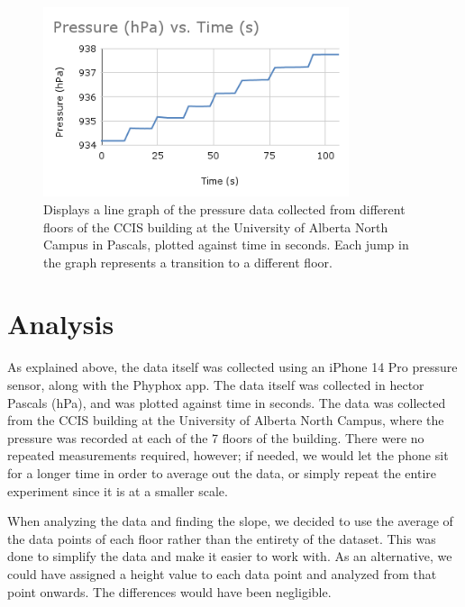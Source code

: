\documentclass{article}
\begin{document}
\begin{figure}[h]
    \centering
    \includegraphics[width=0.8\textwidth]{Pressure-Time.png}
    \caption{Displays a line graph of the pressure data collected from different floors of the CCIS building
    at the University of Alberta North Campus in Pascals, plotted against time in seconds. Each jump in the graph represents a
    transition to a different floor.}
    \label{fig:pressure-time}
\end{figure}

\section{Analysis}

As explained above, the data itself was collected using an iPhone 14 Pro pressure sensor,
along with the Phyphox app. The data itself was collected in hector Pascals (hPa), and was
plotted against time in seconds. The data was collected from the CCIS building at the University of Alberta North Campus,
where the pressure was recorded at each of the 7 floors of the building. There were no repeated measurements required,
however; if needed, we would let the phone sit for a longer time in order to average out the data, or simply repeat the entire experiment since
it is at a smaller scale.

When analyzing the data and finding the slope, we decided to use the average of the data points of each floor rather than the entirety of the dataset.
This was done to simplify the data and make it easier to work with. As an alternative, we could have assigned a height value to each data point and
analyzed from that point onwards. The differences would have been negligible.
\end{document}
